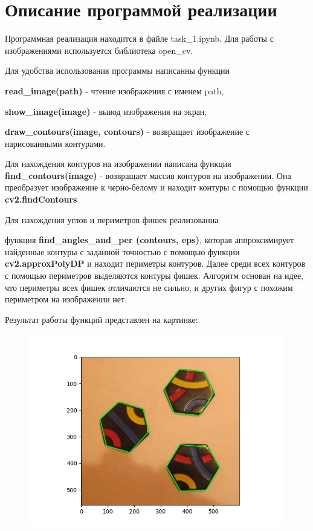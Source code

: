 \documentclass[a4paper, 12pt]{article}
\begin{document}
\section{Описание программой реализации}

Программная реализация находится в файле task\_1.ipynb. Для работы с изображениями используется библиотека open\_cv.

Для удобства использования программы написанны функции 

\textbf{read\_image(path)} - чтение изображения с именем path, 

\textbf{show\_image(image)} - вывод изображения на экран, 

\textbf{draw\_contours(image, contours)} - возвращает изображение с нарисованными контурами. 

Для нахождения контуров на изображении написана функция 
\textbf{find\_contours(image)} - возвращает массив контуров на изображении. Она преобразует изображение к черно-белому и находит контуры с помощью функции  \textbf{cv2.findContours}

Для нахождения углов и периметров фишек реализованна 

функция  \textbf{find\_angles\_and\_per
(contours, eps)}, которая аппроксимирует найденные контуры с заданной точностью с помощью функции \textbf{cv2.approxPolyDP} и находит периметры контуров. Далее среди всех контуров с помощью периметров выделяются контуры фишек. Алгоритм основан на идее, что периметры всех фишек отличаются не сильно, и других фигур с похожим периметром на изображении нет. 


Результат работы функций представлен на картинке: 

\begin{figure}[H]
        	\centering
        	\includegraphics[width=0.7\linewidth]{contours_1.jpg}
        	\label{fig:mpr_2}
        	\vspace{-25pt}
        	\caption{}
\end{figure}
\end{document}
